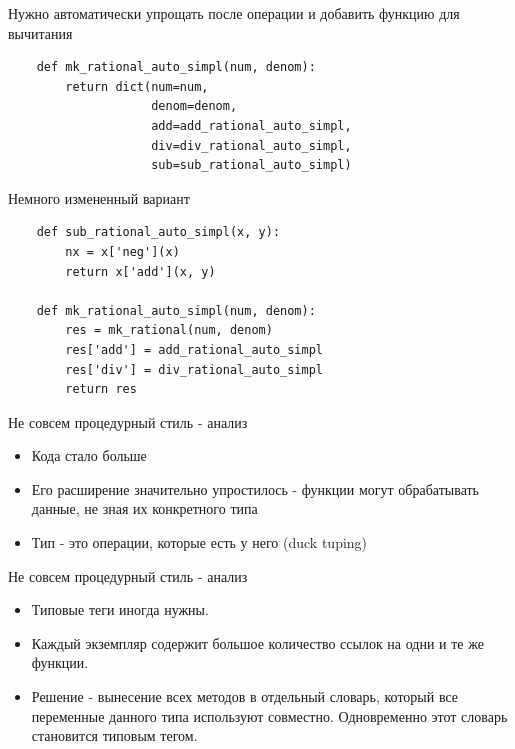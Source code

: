 \documentclass{article}
\begin{document}
\begin{center} Нужно автоматически упрощать после операции 
    и добавить функцию для вычитания \end{center}
\begin{lstlisting}
    def mk_rational_auto_simpl(num, denom):
        return dict(num=num, 
                    denom=denom, 
                    add=add_rational_auto_simpl, 
                    div=div_rational_auto_simpl,
                    sub=sub_rational_auto_simpl)
\end{lstlisting}
\newpage

\begin{center} Немного измененный вариант \end{center}
\begin{lstlisting}
    def sub_rational_auto_simpl(x, y):
        nx = x['neg'](x)
        return x['add'](x, y)

    def mk_rational_auto_simpl(num, denom):
        res = mk_rational(num, denom)
        res['add'] = add_rational_auto_simpl
        res['div'] = div_rational_auto_simpl
        return res
\end{lstlisting}
\newpage

\begin{center} Не совсем процедурный стиль - анализ \end{center}
\begin{itemize}
    \item Кода стало больше
    \item Его расширение значительно упростилось - функции 
            могут обрабатывать данные, не зная их конкретного типа
    \item Тип - это операции, которые есть у него (duck tuping)
\end{itemize}
\newpage

\begin{center} Не совсем процедурный стиль - анализ \end{center}
\begin{itemize}
    \item Типовые теги иногда нужны.
    \item Каждый экземпляр содержит большое количество ссылок на одни и те же
          функции.
    \item Решение - вынесение всех методов в отдельный словарь, который все 
          переменные данного типа используют совместно. Одновременно этот
          словарь становится типовым тегом.
\end{itemize}
\newpage
\end{document}
